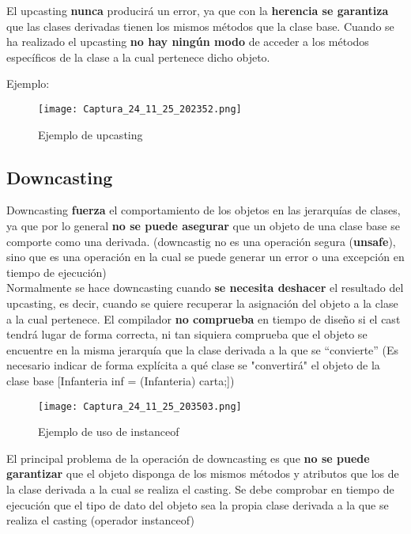 \documentclass{article}
\begin{document}
El upcasting \textbf{nunca} producirá un error, ya que con la \textbf{herencia se garantiza} que las clases derivadas tienen los mismos métodos que la clase base. Cuando se ha realizado el upcasting \textbf{no hay ningún modo} de acceder a los métodos específicos de la clase a la cual pertenece dicho objeto.

Ejemplo:
\begin{figure}[h]
    \centering
    \texttt{[image: Captura\_24\_11\_25\_202352.png]}
        \caption{Ejemplo de upcasting}
\end{figure}

\newpage

\subsection{Downcasting}
Downcasting \textbf{fuerza} el comportamiento de los objetos en las jerarquías de clases, ya que por lo general \textbf{no se puede asegurar} que un objeto de una clase base se comporte como una derivada. (downcastig no es una operación segura (\textbf{unsafe}), sino que es una operación en la cual se puede generar un error o una excepción en tiempo de ejecución) \\

Normalmente se hace downcasting cuando \textbf{se necesita deshacer} el resultado del upcasting, es decir, cuando se quiere recuperar la asignación del objeto a la clase a la cual pertenece. El compilador \textbf{no comprueba} en tiempo de diseño si el cast tendrá lugar de forma correcta, ni tan siquiera comprueba que el objeto se encuentre en la misma jerarquía que la clase derivada a la que se “convierte” 
(Es necesario indicar de forma explícita a qué clase se "convertirá" el objeto de la clase base [Infanteria inf = (Infanteria) carta;]) \\

\begin{wrapfigure}[]{r}{0.5\linewidth}
    \centering
    \texttt{[image: Captura\_24\_11\_25\_203503.png]}
    \caption{Ejemplo de uso de instanceof}
\end{wrapfigure}

El principal problema de la operación de downcasting es que \textbf{no se puede garantizar} que el objeto disponga de los mismos métodos y atributos que los de la clase derivada a la cual se
realiza el casting. Se debe comprobar en tiempo de ejecución que el tipo de dato del objeto sea la propia clase derivada a la que se realiza el casting (operador instanceof) \\
\end{document}
